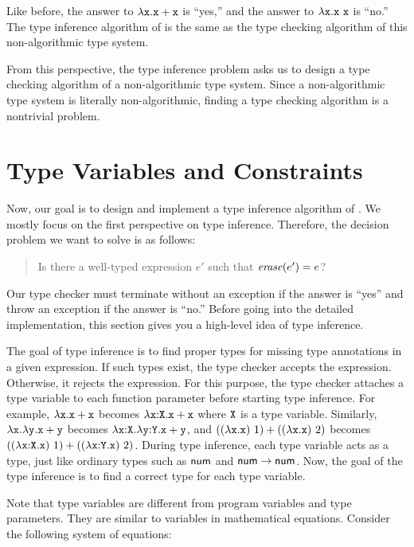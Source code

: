 Like before, the answer to $\lambda\texttt{x}.\texttt{x}+\texttt{x}$ is ``yes,'' and the
answer to $\lambda\texttt{x}.\texttt{x}\ \texttt{x}$ is ``no.'' The type inference algorithm
of \lang is the same as the type checking algorithm of this non-algorithmic type
system.

From this perspective, the type inference problem asks us to design a type
checking algorithm of a non-algorithmic type system. Since a non-algorithmic
type system is literally non-algorithmic, finding a type checking algorithm is
a nontrivial problem.

\section{Type Variables and Constraints}

Now, our goal is to design and implement a type inference algorithm of
\lang. We mostly focus on the first perspective on type inference. Therefore,
the decision problem we want to solve is as follows:

\begin{quote}
  \hspace{-1em}Is there a well-typed \plang expression $e'$ such that $\mbox{\emph{erase}}(e')=e$?
\end{quote}

Our type checker must terminate without an exception if the answer is ``yes''
and throw an exception if the answer is ``no.'' Before going into the detailed
implementation, this section gives you a high-level idea of type inference.

The goal of type inference is to find proper types for missing type annotations
in a given expression. If such types exist, the type checker accepts the
expression. Otherwise, it rejects the expression.  For this purpose, the type
checker attaches a type variable to each function parameter before starting type
inference. For example, $\lambda\texttt{x}.\texttt{x}+\texttt{x}$ becomes
$\lambda\texttt{x}{:}\texttt{X}.\texttt{x}+\texttt{x}$ where $\texttt{X}$ is a type variable. Similarly,
$\lambda\texttt{x}.\lambda\texttt{y}.\texttt{x}+\texttt{y}$ becomes
$\lambda\texttt{x}{:}\texttt{X}.\lambda\texttt{y}{:}\texttt{Y}.\texttt{x}+\texttt{y}$, and
$((\lambda\texttt{x}.\texttt{x})\ 1)+((\lambda\texttt{x}.\texttt{x})\ 2)$ becomes
$((\lambda\texttt{x}{:}\texttt{X}.\texttt{x})\ 1)+((\lambda\texttt{x}{:}\texttt{Y}.\texttt{x})\ 2)$.
During type inference, each type variable acts as a type, just like
ordinary types such as $\textsf{num}$ and $\textsf{num}\rightarrow\textsf{num}$. Now, the goal of the
type inference is to find a correct type for each type variable.

Note that type variables are different from program variables and type
parameters. They are similar to variables in mathematical equations. Consider
the following system of equations:

